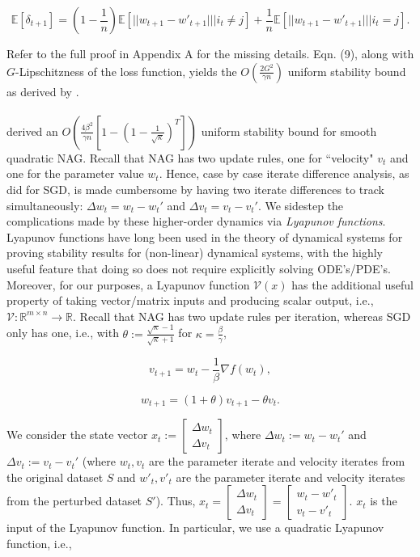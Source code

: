 \documentclass[twoside,11pt]{article}
\begin{document}
\begin{equation}
\mathbb{E}[\delta_{t+1}] = (1-\frac{1}{n})\mathbb{E}[||w_{t+1} - w'_{t+1}|| | i_t \neq j] + \frac{1}{n}\mathbb{E}[||w_{t+1} - w'_{t+1}|| | i_t = j].
\end{equation}

\noindent
Refer to the full proof in Appendix A for the missing details. Eqn. (9), along with $G$-Lipschitzness of the loss function, yields the $O(\frac{2G^2}{\gamma n})$ uniform stability bound as derived by \cite{HRS16}. \\
\\
\cite{CJY18} derived an $O(\frac{4\beta^2}{\gamma n}[1-(1 - \frac{1}{\sqrt{\kappa}})^T])$ uniform stability bound for smooth quadratic NAG. Recall that NAG has two update rules, one for ``velocity" $v_t$ and one for the parameter value $w_t$. Hence, case by case iterate difference analysis, as \cite{HRS16} did for SGD, is made cumbersome by having two iterate differences to track simultaneously: $\Delta w_t = w_t - w_t'$ and $\Delta v_t = v_t - v_t'$. We sidestep the complications made by these higher-order dynamics via \textit{Lyapunov functions}. Lyapunov functions have long been used in the theory of dynamical systems for proving stability results for (non-linear) dynamical systems, with the highly useful feature that doing so does not require explicitly solving ODE's/PDE's. Moreover, for our purposes, a Lyapunov function $\mathcal{V}(x)$ has the additional useful property of taking vector/matrix inputs and producing scalar output, i.e., $\mathcal{V}: \mathbb{R}^{m \times n} \rightarrow \mathbb{R}$. Recall that NAG has two update rules per iteration, whereas SGD only has one, i.e., with $\theta := \frac{\sqrt{\kappa}-1}{\sqrt{\kappa}+1}$ for $\kappa = \frac{\beta}{\gamma}$, 

\begin{equation}
v_{t+1} = w_t - \frac{1}{\beta} \nabla f(w_t),
\end{equation}

\begin{equation}
w_{t+1} = (1 + \theta)v_{t+1} - \theta v_t.
\end{equation}

\noindent
We consider the state vector $x_t := \begin{bmatrix}
    \Delta w_t \\
    \Delta v_t
\end{bmatrix}$, where $\Delta w_t := w_t - w_t'$ and $\Delta v_t := v_t - v_t'$ (where $w_t, v_t$ are the parameter iterate and velocity iterates from the original dataset $S$ and $w'_t, v'_t$ are the parameter iterate and velocity iterates from the perturbed dataset $S'$). Thus, $x_t = \begin{bmatrix}
    \Delta w_t \\
    \Delta v_t
\end{bmatrix} = \begin{bmatrix}
    w_t - w'_t \\
    v_t - v'_t
\end{bmatrix}$. $x_t$ is the input of the Lyapunov function. In particular, we use a quadratic Lyapunov function, i.e.,
\end{document}

